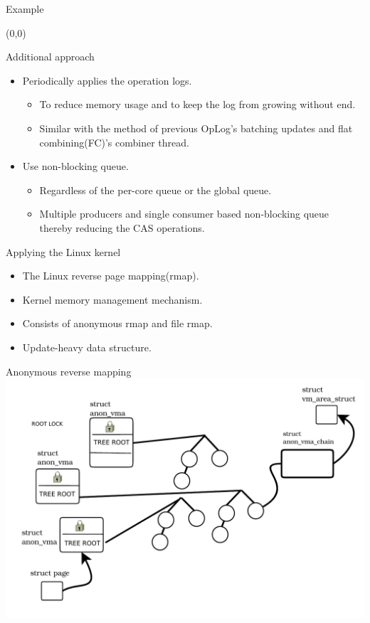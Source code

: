 \documentclass[english]{beamer} %
\begin{document}
\begin{frame}{Example}
\begin{textblock}{1}(0,0)
\end{textblock}
\end{frame}


\begin{frame}{Additional approach}
    \begin{itemize}
    \item Periodically applies the operation logs.
    \begin{itemize}
    \item To reduce memory usage and to keep the log from growing without
    end.
    \item Similar with the method of previous OpLog’s batching
    updates and flat combining(FC)’s combiner thread.
    \end{itemize}
    \item Use non-blocking queue.
    \begin{itemize}
      \item Regardless of the per-core queue or the global
      queue.
      \item Multiple producers and single consumer based non-blocking queue
      thereby reducing the CAS operations.
    \end{itemize}
    \end{itemize}
\end{frame}



\begin{frame}{Applying the Linux kernel}
    \begin{itemize}[<+-| alert@+>]
    \item The Linux reverse page mapping(rmap).
    \item Kernel memory management mechanism.
    \item Consists of anonymous rmap and file rmap.
    \item Update-heavy data structure.
    \end{itemize}
\end{frame}

\begin{frame}{Anonymous reverse mapping}
\includegraphics[scale=0.5]{fig/anon_vma_default_0}
\end{frame}
\end{document}

